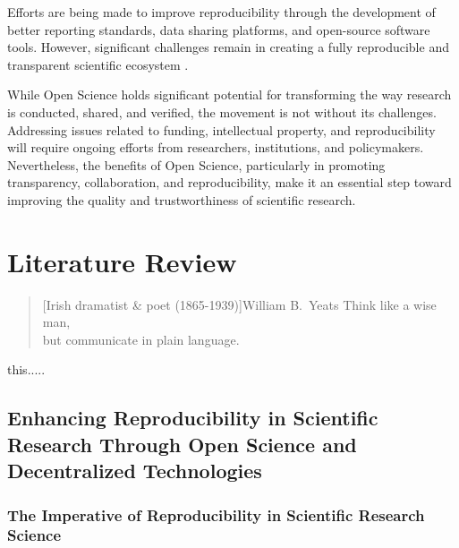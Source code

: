 \documentclass[final]{rc-book-2.14}
\begin{document}
Efforts are being made to improve reproducibility through the development of better reporting standards, data sharing platforms, and open-source software tools. However, significant challenges remain in creating a fully reproducible and transparent scientific ecosystem \cite{Nosek2015}.

While Open Science holds significant potential for transforming the way research is conducted, shared, and verified, the movement is not without its challenges. Addressing issues related to funding, intellectual property, and reproducibility will require ongoing efforts from researchers, institutions, and policymakers. Nevertheless, the benefits of Open Science, particularly in promoting transparency, collaboration, and reproducibility, make it an essential step toward improving the quality and trustworthiness of scientific research.

\chapter{Literature Review}
\label{chp:review}

\begin{quotation}[Irish dramatist \& poet (1865-1939)]{William B.~Yeats}
    Think like a wise man, \\ but communicate in plain language.
\end{quotation}

\drop this.....

\newpage

\section{Enhancing Reproducibility in Scientific Research Through Open Science and Decentralized Technologies}

\subsection{The Imperative of Reproducibility in Scientific Research Science}
\end{document}
